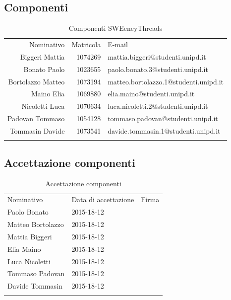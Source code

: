 \documentclass[a4paper]{article}
\begin{document}
\begin{appendices}
		\subsection{Componenti}
		\begin{table}[H]
			\begin{tabularx}{\textwidth}{r r k}
				Nominativo & Matricola & E-mail \\
				Biggeri Mattia & 1074269 & mattia.biggeri@studenti.unipd.it \\
				Bonato Paolo & 1023655 & paolo.bonato.3@studenti.unipd.it\\
				Bortolazzo Matteo & 1073194 & matteo.bortolazzo.1@studenti.unipd.it \\
				Maino Elia & 1069880 & elia.maino@studenti.unipd.it \\
				Nicoletti Luca & 1070634 & luca.nicoletti.2@studenti.unipd.it \\
				Padovan Tommaso & 1054128 & tommaso.padovan@studenti.unipd.it \\
				Tommasin Davide & 1073541 & davide.tommasin.1@studenti.unipd.it \\
			\end{tabularx}
			\caption{Componenti SWEeneyThreads } 
			\label{ComponentiGruppo}
		\end{table}
		\subsection{Accettazione componenti}
		\begin{table}[H]
			\begin{tabularx}{\textwidth}{Y Y Y}
				Nominativo & Data di accettazione & Firma\\
				Paolo Bonato & 2015-18-12 & \\
				Matteo Bortolazzo & 2015-18-12 & \\
				Mattia Biggeri & 2015-18-12 & \\
				Elia Maino & 2015-18-12 & \\
				Luca Nicoletti & 2015-18-12 & \\
				Tommaso Padovan & 2015-18-12 & \\
				Davide Tommasin & 2015-18-12 & \\
			\end{tabularx}
			\caption{Accettazione componenti } 
			\label{AccComponenti}
		\end{table}

\end{appendices}
\end{document}
